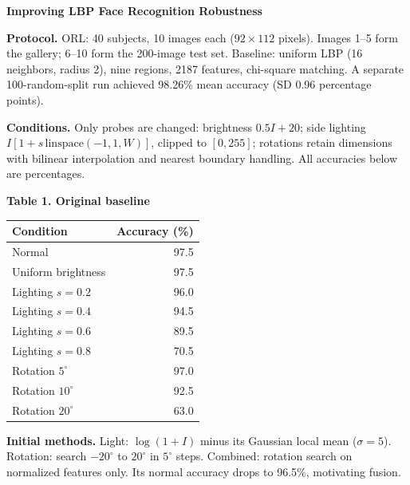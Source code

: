 \documentclass[10pt,a4paper]{article}
\begin{document}
{\centering\Large\bfseries Improving LBP Face Recognition Robustness\par}
\vspace{4pt}
\textbf{Protocol.} ORL: 40 subjects, 10 images each ($92\times112$ pixels). Images 1--5 form the gallery; 6--10 form the 200-image test set. Baseline: uniform LBP (16 neighbors, radius 2), nine regions, 2187 features, chi-square matching. A separate 100-random-split run achieved 98.26\% mean accuracy (SD 0.96 percentage points).

\textbf{Conditions.} Only probes are changed: brightness $0.5I+20$; side lighting $I[1+s\,\mathrm{linspace}(-1,1,W)]$, clipped to $[0,255]$; rotations retain dimensions with bilinear interpolation and nearest boundary handling. All accuracies below are percentages.

\begin{minipage}{\linewidth}
\centering
\textbf{Table 1. Original baseline}\par\vspace{2pt}
{\fontsize{9}{10.5}\selectfont
\begin{tabular}{@{}lr@{}}
\toprule
Condition & Accuracy (\%)\\
\midrule
Normal & 97.5\\
Uniform brightness & 97.5\\
Lighting $s=0.2$ & 96.0\\
Lighting $s=0.4$ & 94.5\\
Lighting $s=0.6$ & 89.5\\
Lighting $s=0.8$ & 70.5\\
Rotation $5^\circ$ & 97.0\\
Rotation $10^\circ$ & 92.5\\
Rotation $20^\circ$ & 63.0\\
\bottomrule
\end{tabular}}
\end{minipage}
\par\vspace{3pt}
\textbf{Initial methods.} Light: $\log(1+I)$ minus its Gaussian local mean ($\sigma=5$). Rotation: search $-20^\circ$ to $20^\circ$ in $5^\circ$ steps. Combined: rotation search on normalized features only. Its normal accuracy drops to 96.5\%, motivating fusion.
\end{document}
